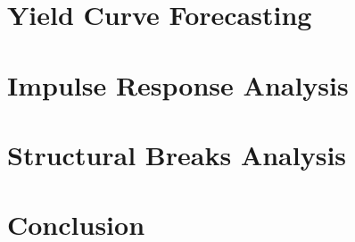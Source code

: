 \documentclass{vegaarticle}
\begin{document}
    \section{Yield Curve Forecasting}
        
    
    \section{Impulse Response Analysis}
        

    \section{Structural Breaks Analysis}
        

    \section{Conclusion}
\end{document}
